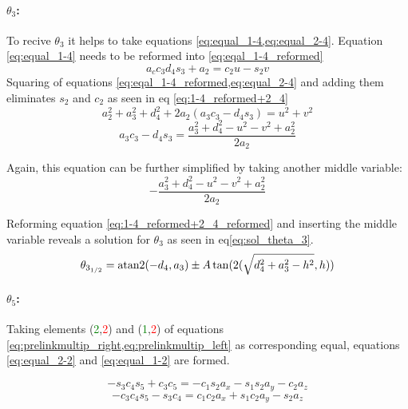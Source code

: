 \paragraph{$\theta_3$:}

To recive $\theta_3$ it helps to take equations \cref{eq:equal_1-4,eq:equal_2-4}. Equation \ref{eq:equal_1-4} needs to be reformed into \ref{eq:eqal_1-4_reformed}
\begin{equation} \label{eq:eqal_1-4_reformed}
	a_c c_3 d_4 s_3 + a_2 = c_2 u -s_2 v
\end{equation}
Squaring of equations \cref{eq:eqal_1-4_reformed,eq:equal_2-4} and adding them eliminates $s_2$ and $c_2$ as seen in eq \ref{eq:1-4_reformed+2_4}
\begin{equation}\label{eq:1-4_reformed+2_4}
	a_2^2 + a_3^2 +d_4^2 + 2 a_2(a_3 c_3 -d_4 s_3) = u^2 + v^2
\end{equation}
\begin{equation}\label{eq:1-4_reformed+2_4_reformed}
	a_3 c_3 - d_4 s_3 = \frac{a_3^2 + d_4^2 - u^2 -v^2 +a_2^2}{2a_2}
\end{equation}

Again, this equation can be further simplified by taking another middle variable:
\begin{equation*}
	-\frac{a_3^2 + d_4^2 - u^2 -v^2 + a_2^2}{2a_2}
\end{equation*}

Reforming equation \ref{eq:1-4_reformed+2_4_reformed} and inserting the middle variable reveals a solution for $\theta_3$ as seen in eq\ref{eq:sol_theta_3}.
\begin{equation}\label{eq:sol_theta_3}
	\theta_{3_{1/2}} = \operatorname{atan2}(-d_4 , a_3) \pm A \tan (2 (\sqrt{d_4^2 +a_3^2 -h^2} , h))
\end{equation}


\paragraph{$\theta_5$:}
Taking elements (\textcolor{green}{2},\textcolor{red}{2}) and (\textcolor{green}{1},\textcolor{red}{2}) of equations \cref{eq:prelinkmultip_right,eq:prelinkmultip_left} as corresponding equal, equations \ref{eq:equal_2-2} and \ref{eq:equal_1-2} are formed.

\begin{equation}\label{eq:equal_2-2}
	-s_3 c_4 s_5 + c_3 c_5 = -c_1 s_2 a_x - s_1 s_2 a_y -c_2 a_z
\end{equation}
\begin{equation}\label{eq:equal_1-2}
	-c_3 c_4 s_5 - s_3 c_4 = c_1 c_2 a_x + s_1 c_2 a_y - s_2 a_z
\end{equation}

